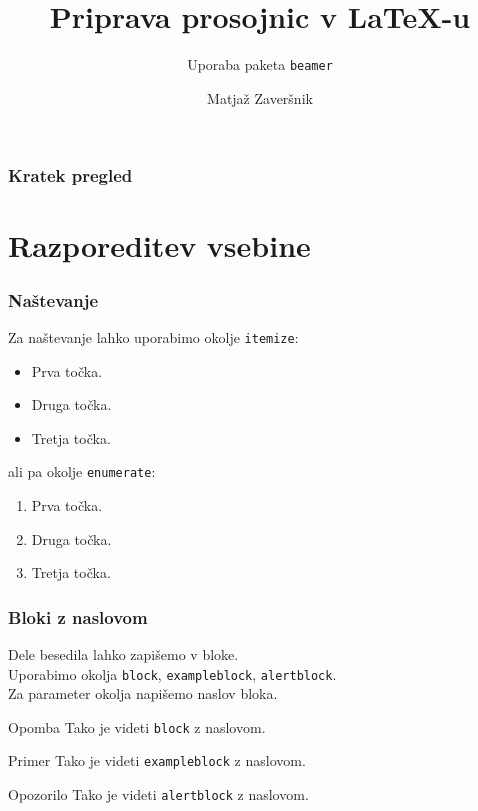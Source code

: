 \documentclass{beamer}
\begin{document}

\title{Priprava prosojnic v \LaTeX-u}
\subtitle{Uporaba paketa \texttt{beamer}}
\author{Matjaž Zaveršnik}
\date{}

\begin{frame}
   \titlepage
\end{frame}


\begin{frame}
   \frametitle{Kratek pregled}
   \tableofcontents[pausesections]
\end{frame}


\section{Razporeditev vsebine}


\begin{frame}
   \frametitle{Naštevanje}
   Za naštevanje lahko uporabimo okolje \texttt{itemize}:
   \begin{itemize}
      \item Prva točka.
      \item Druga točka.
      \item Tretja točka.
   \end{itemize}
   ali pa okolje \texttt{enumerate}:
   \begin{enumerate}
      \item Prva točka.
      \item Druga točka.
      \item Tretja točka.
   \end{enumerate}
\end{frame}


\begin{frame}
   \frametitle{Bloki z naslovom}
   Dele besedila lahko zapišemo v bloke. \\
   Uporabimo okolja \texttt{block}, \texttt{exampleblock}, \texttt{alertblock}. \\
   Za parameter okolja napišemo naslov bloka.
   \begin{block}{Opomba}
      Tako je videti \texttt{block} z naslovom.
   \end{block}
   \begin{exampleblock}{Primer}
      Tako je videti \texttt{exampleblock} z naslovom.
   \end{exampleblock}
   \begin{alertblock}{Opozorilo}
      Tako je videti \texttt{alertblock} z naslovom.
   \end{alertblock}
\end{frame}
\end{document}
